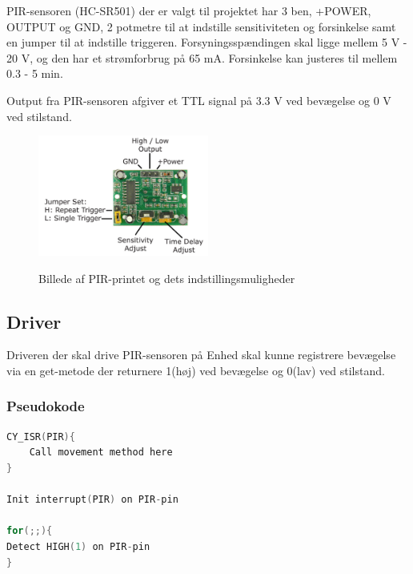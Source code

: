 PIR-sensoren (HC-SR501) der er valgt til projektet har 3 ben, +POWER, OUTPUT og GND, 2 potmetre til at indstille sensitiviteten og forsinkelse samt en jumper til at indstille triggeren. Forsyningsspændingen skal ligge mellem 5 V - 20 V, og den har et strømforbrug på 65 mA. Forsinkelse kan justeres til mellem 0.3 - 5 min.

Output fra PIR-sensoren afgiver et TTL signal på 3.3 V ved bevægelse og 0 V ved stilstand.

\begin{figure}[H] \centering
{\includegraphics[width=0.5\textwidth]{filer/design/Billeder/pir_overview}}
\caption{Billede af PIR-printet og dets indstillingsmuligheder}
\label{lab:pir_overview}
\raggedright
\end{figure}

\subsection*{Driver}

Driveren der skal drive PIR-sensoren på Enhed skal kunne registrere bevægelse via en get-metode der returnere 1(høj) ved bevægelse og 0(lav) ved stilstand.

\subsubsection*{Pseudokode}

\begin{lstlisting}[language=C]
CY_ISR(PIR){
    Call movement method here
} 

Init interrupt(PIR) on PIR-pin

for(;;){
Detect HIGH(1) on PIR-pin
}
\end{lstlisting}